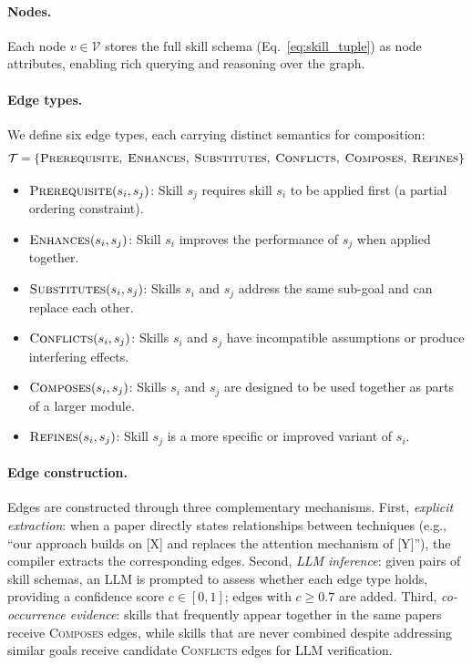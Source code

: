\paragraph{Nodes.} Each node $v \in \mathcal{V}$ stores the full skill schema (Eq.~\ref{eq:skill_tuple}) as node attributes, enabling rich querying and reasoning over the graph.

\paragraph{Edge types.} We define six edge types, each carrying distinct semantics for composition:
\begin{equation}
\label{eq:edge_types}
\mathcal{T} = \{\textsc{Prerequisite},\; \textsc{Enhances},\; \textsc{Substitutes},\; \textsc{Conflicts},\; \textsc{Composes},\; \textsc{Refines}\}
\end{equation}
\begin{itemize}[leftmargin=1.2em,itemsep=2pt]
    \item $\textsc{Prerequisite}(s_i, s_j)$: Skill $s_j$ requires skill $s_i$ to be applied first (a partial ordering constraint).
    \item $\textsc{Enhances}(s_i, s_j)$: Skill $s_i$ improves the performance of $s_j$ when applied together.
    \item $\textsc{Substitutes}(s_i, s_j)$: Skills $s_i$ and $s_j$ address the same sub-goal and can replace each other.
    \item $\textsc{Conflicts}(s_i, s_j)$: Skills $s_i$ and $s_j$ have incompatible assumptions or produce interfering effects.
    \item $\textsc{Composes}(s_i, s_j)$: Skills $s_i$ and $s_j$ are designed to be used together as parts of a larger module.
    \item $\textsc{Refines}(s_i, s_j)$: Skill $s_j$ is a more specific or improved variant of $s_i$.
\end{itemize}

\paragraph{Edge construction.} Edges are constructed through three complementary mechanisms. First, \emph{explicit extraction}: when a paper directly states relationships between techniques (e.g., ``our approach builds on [X] and replaces the attention mechanism of [Y]''), the compiler extracts the corresponding edges. Second, \emph{LLM inference}: given pairs of skill schemas, an LLM is prompted to assess whether each edge type holds, providing a confidence score $c \in [0,1]$; edges with $c \geq 0.7$ are added. Third, \emph{co-occurrence evidence}: skills that frequently appear together in the same papers receive \textsc{Composes} edges, while skills that are never combined despite addressing similar goals receive candidate \textsc{Conflicts} edges for LLM verification.

